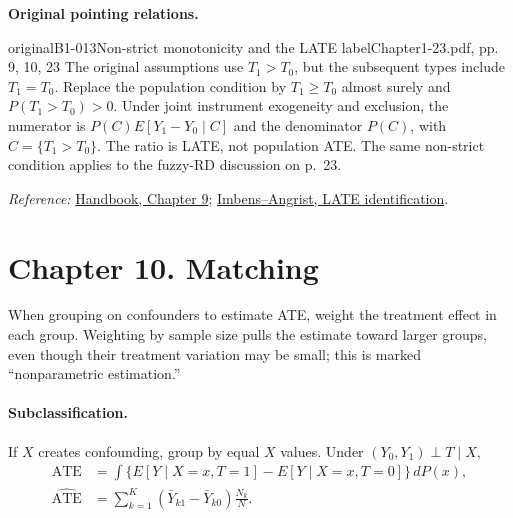 {\par{}\smallskip\textbf{Original pointing relations.}\par\smallskip
{}
\begin{reviewnote}{original}{B1-013}{Non-strict monotonicity and the LATE label}{Chapter1-23.pdf, pp. 9, 10, 23}
The original assumptions use $T_1>T_0$, but the subsequent types include $T_1=T_0$. Replace the population condition by $T_1\ge T_0$ almost surely and $P(T_1>T_0)>0$. Under joint instrument exogeneity and exclusion, the numerator is $P(C)E[Y_1-Y_0\mid C]$ and the denominator $P(C)$, with $C=\{T_1>T_0\}$. The ratio is LATE, not population ATE. The same non-strict condition applies to the fuzzy-RD discussion on p.~23.
\par\smallskip\textit{Reference:} \href{https://matheusfacure.github.io/python-causality-handbook/09-Non-Compliance-and-LATE.html}{Handbook, Chapter 9}; \href{https://www.nber.org/papers/t0118}{Imbens--Angrist, LATE identification}.
\end{reviewnote}
\section{Chapter 10. Matching}
When grouping on confounders to estimate ATE, weight the treatment effect in each group. Weighting by sample size pulls the estimate toward larger groups, even though their treatment variation may be small; this is marked ``nonparametric estimation.'' 

\paragraph{Subclassification.}
If $X$ creates confounding, group by equal $X$ values. Under $(Y_0,Y_1)\perp T\mid X$,
\begin{align*}
\mathrm{ATE}&=\int\{E[Y\mid X=x,T=1]-E[Y\mid X=x,T=0]\}\,dP(x),\\
\widehat{\mathrm{ATE}}&=\sum_{k=1}^{K}(\bar Y_{k1}-\bar Y_{k0})\frac{N_k}{N}.
\end{align*}

}

